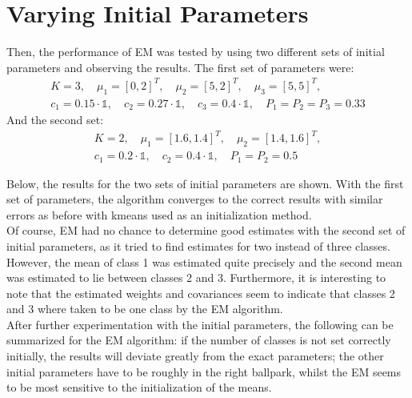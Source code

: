 \documentclass[DIV=12, ngerman, fontsize=12pt, parskip=half]{scrreprt}
\begin{document}
	\section{Varying Initial Parameters}
	Then, the performance of EM was tested by using two different sets of initial parameters and observing the results. The first set of parameters were:
	\begin{align*}
		K = 3, \quad \mu_1 = [0,2]^T, \quad \mu_2 = [5,2]^T, \quad \mu_3 = [5,5]^T, \\ c_1 = 0.15 \cdot \mathbb{1}, \quad c_2 = 0.27 \cdot \mathbb{1}, \quad c_3 = 0.4 \cdot \mathbb{1}, \quad P_1 = P_2 = P_3 = 0.33
	\end{align*}
	And the second set:
	\begin{align*}
	K = 2, \quad \mu_1 = [1.6,1.4]^T, \quad \mu_2 = [1.4,1.6]^T, \\ c_1 = 0.2 \cdot \mathbb{1}, \quad c_2 = 0.4 \cdot \mathbb{1}, \quad P_1 = P_2 = 0.5
	\end{align*}	

	Below, the results for the two sets of initial parameters are shown. With the first set of parameters, the algorithm converges to the correct results with similar errors as before with kmeans used as an initialization method. \\
	Of course, EM had no chance to determine good estimates with the second set of initial parameters, as it tried to find estimates for two instead of three classes. However, the mean of class 1 was estimated quite precisely and the second mean was estimated to lie between classes 2 and 3. Furthermore, it is interesting to note that the estimated weights and covariances seem to indicate that classes 2 and 3 where taken to be one class by the EM algorithm. \\
	After further experimentation with the initial parameters, the following can be summarized for the EM algorithm: if the number of classes is not set correctly initially, the results will deviate greatly from the exact parameters; the other initial parameters have to be roughly in the right ballpark, whilst the EM seems to be most sensitive to the initialization of the means. 
\end{document}
